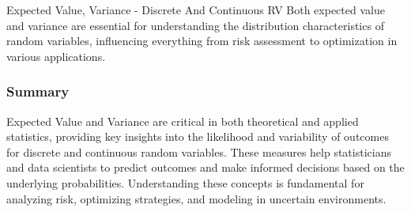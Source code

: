\begin{notes}{Expected Value, Variance - Discrete And Continuous RV}
    Both expected value and variance are essential for understanding the distribution characteristics of random variables, influencing everything from risk assessment to optimization in various applications.
    
    \subsubsection*{Summary}
    
    Expected Value and Variance are critical in both theoretical and applied statistics, providing key insights into the likelihood and variability of outcomes for discrete and continuous random variables. 
    These measures help statisticians and data scientists to predict outcomes and make informed decisions based on the underlying probabilities. Understanding these concepts is fundamental for analyzing 
    risk, optimizing strategies, and modeling in uncertain environments.    
\end{notes}